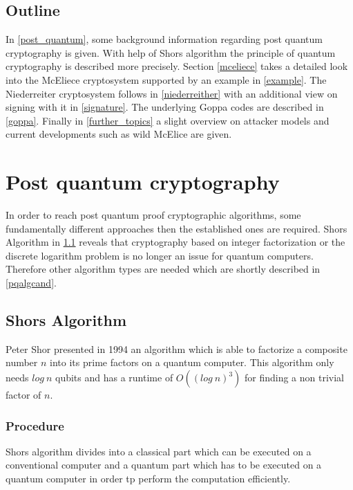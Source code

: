 \subsection*{Outline}
In \autoref{post_quantum}, some background information regarding post quantum cryptography is given. With help of Shors algorithm the principle of quantum cryptography is described more precisely. Section \ref{mceliece} takes a detailed look into the McEliece cryptosystem supported by an example in \autoref{example}. The Niederreiter cryptosystem follows in \autoref{niederreither} with an additional view on signing with it in \autoref{signature}. The underlying Goppa codes are described in \autoref{goppa}. Finally in \autoref{further_topics} a slight overview on attacker models and current developments such as wild McElice are given.


\section{Post quantum cryptography}
\label{post_quantum}
In order to reach post quantum proof cryptographic algorithms, some fundamentally different approaches then the established ones are required. Shors Algorithm in \ref{shoor} reveals that cryptography based on integer factorization or the discrete logarithm problem is no longer an issue for quantum computers. Therefore other algorithm types are needed which are shortly described in \ref{pqalgcand}.   

\subsection{Shors Algorithm}
\label{shoor}
Peter Shor presented in 1994 an algorithm which is able to factorize a composite number $n$ into its prime factors on a quantum computer. This algorithm only needs $log\: n$ qubits and has a runtime of $O((log\: n)^3)$ for finding a non trivial factor of $n$. 

\subsubsection*{Procedure}
Shors algorithm divides into a classical part which can be executed on a conventional computer and a quantum part which has to be executed on a quantum computer in order tp perform the computation efficiently. 

